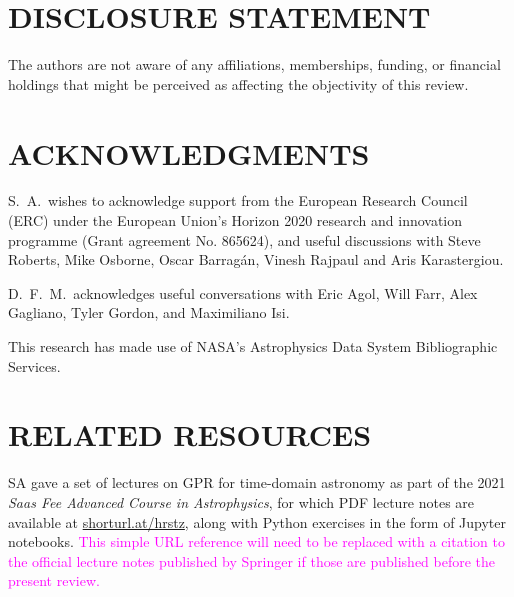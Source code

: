 \documentclass[letterpaper]{ar-1col}
\newcommand{\suz}[1]{\textcolor{magenta}{#1}}
\begin{document}
\section*{DISCLOSURE STATEMENT}
The authors are not aware of any affiliations, memberships, funding, or financial holdings that
might be perceived as affecting the objectivity of this review.

\section*{ACKNOWLEDGMENTS}
S.\ A.\ wishes to acknowledge support from the European Research Council (ERC) under the 
European Union's Horizon 2020 
research and innovation programme (Grant agreement No. 865624), and useful discussions with Steve Roberts, Mike Osborne, Oscar Barrag{\'a}n, Vinesh Rajpaul and Aris Karastergiou.

D.\ F.\ M.\ acknowledges useful conversations with
Eric Agol,
Will Farr,
Alex Gagliano,
Tyler Gordon,
and Maximiliano Isi.


This research has made use of NASA's Astrophysics Data System Bibliographic Services.

%




\section*{RELATED RESOURCES}

SA gave a set of lectures on GPR for time-domain astronomy as part of the 2021 \emph{Saas Fee Advanced Course in Astrophysics}, for which PDF lecture notes are available at \url{shorturl.at/hrstz}, along with {\sc Python} exercises in the form of {\sc Jupyter} notebooks. \suz{This simple URL reference will need to be replaced with a citation to the official lecture notes published by Springer if those are published before the present review.}
\end{document}

